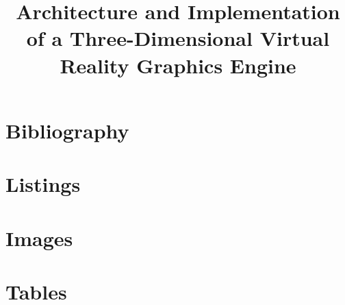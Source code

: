 \documentclass{article}
\begin{document}

\title{Architecture and Implementation of a Three-Dimensional Virtual Reality Graphics Engine}
\maketitle

\newpage
\tableofcontents

\newpage























\nocite{*}

\newpage
\section{Bibliography} %
\printbibliography

\newpage
\section{Listings}
\renewcommand{\lstlistlistingname}{}
\lstlistoflistings

\newpage
\section{Images}
\renewcommand{\listfigurename}{}
\listoffigures

\newpage
\section{Tables}
\renewcommand{\listtablename}{}
\listoftables
\end{document}
